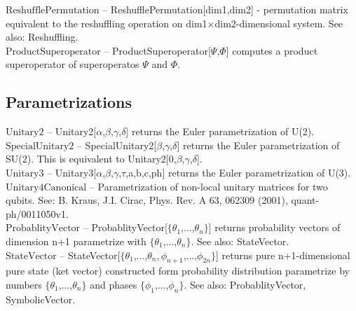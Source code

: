 \noindent\textbf{$ \text{ReshufflePermutation} $ }-- ReshufflePermutation[dim1,dim2] - permutation matrix equivalent to the reshuffling operation on dim1$\times $dim2-dimensional system. See also: Reshuffling.$  $\\[6pt]

\noindent\textbf{$ \text{ProductSuperoperator} $ }-- ProductSuperoperator[$\Psi $,$\Phi $] computes a product superoperator of superoperatos $\Psi $ and $\Phi $.$  $\\[6pt]

\subsection{Parametrizations}

\noindent\textbf{$ \text{Unitary2} $ }-- Unitary2[$\alpha $,$\beta $,$\gamma $,$\delta $] returns the Euler parametrization of U(2).$  $\\[6pt]

\noindent\textbf{$ \text{SpecialUnitary2} $ }-- SpecialUnitary2[$\beta $,$\gamma $,$\delta $] returns the Euler parametrization of SU(2). This is equivalent to Unitary2[0,$\beta $,$\gamma $,$\delta $].$  $\\[6pt]

\noindent\textbf{$ \text{Unitary3} $ }-- Unitary3[$\alpha $,$\beta $,$\gamma $,$\tau $,a,b,c,ph] returns the Euler parametrization of U(3).$  $\\[6pt]

\noindent\textbf{$ \text{Unitary4Canonical} $ }-- Parametrization of non-local unitary matrices for two qubits. See: B. Kraus, J.I. Cirac, Phys. Rev. A 63, 062309 (2001), quant-ph/0011050v1.$  $\\[6pt]

\noindent\textbf{$ \text{ProbablityVector} $ }-- ProbablityVector[$\{$$ \theta _1 $,...,$ \theta _n $$\}$] returns probability vectors of dimension n+1 parametrize with $\{$$ \theta _1 $,...,$ \theta _n $$\}$. See also: StateVector.$  $\\[6pt]

\noindent\textbf{$ \text{StateVector} $ }-- StateVector[$\{$$ \theta _1 $,...,$ \theta _n,\phi _{n+1} $,...,$ \phi _{2 n} $$\}$] returns pure n+1-dimensional pure state (ket vector) constructed form probability distribution parametrize by numbers $\{$$ \theta _1 $,...,$ \theta _n $$\}$ and phases $\{$$ \phi _1 $,...,$ \phi _n $$\}$. See also: ProbablityVector, SymbolicVector.$  $\\[6pt]

